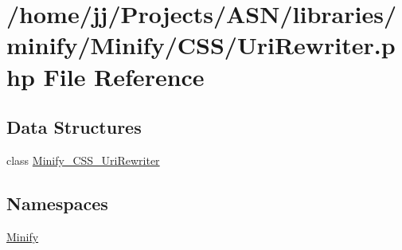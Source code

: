 \hypertarget{_uri_rewriter_8php}{}\section{/home/jj/\+Projects/\+A\+S\+N/libraries/minify/\+Minify/\+C\+S\+S/\+Uri\+Rewriter.php File Reference}
\label{_uri_rewriter_8php}
\subsection*{Data Structures}
\begin{DoxyCompactItemize}
\item 
class \hyperlink{class_minify___c_s_s___uri_rewriter}{Minify\+\_\+\+C\+S\+S\+\_\+\+Uri\+Rewriter}
\end{DoxyCompactItemize}
\subsection*{Namespaces}
\begin{DoxyCompactItemize}
\item 
 \hyperlink{namespace_minify}{Minify}
\end{DoxyCompactItemize}
